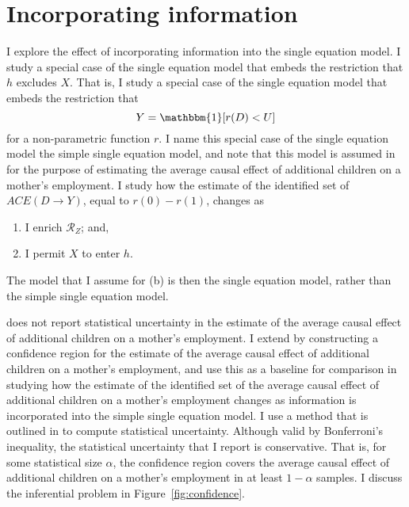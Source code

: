 \documentclass[12pt,a4paper,twoside]{article}
\numberwithin{equation}{section}
\begin{document}
\section{Incorporating information}
I explore the effect of incorporating information into the single equation model. I study a special case of the single equation model that embeds the restriction that $h$ excludes $X$. That is, I study a special case of the single equation model that embeds the restriction that 
\[Y=\mathbbm{1}[r(D)<U]\]
for a non-parametric function $r$. I name this special case of the single equation model the simple single equation model, and note that this model is assumed in \cite{cr13} for the purpose of estimating the average causal effect of additional children on a mother's employment. I study how the estimate of the identified set of $ACE(D\rightarrow Y)$, equal to $r(0)-r(1)$, changes as 
\begin{enumerate}[(a.)]
\item I enrich $\mathcal{R}_Z$; and,
\item I permit $X$ to enter $h$.
\end{enumerate}
The model that I assume for (b) is then the single equation model, rather than the simple single equation model. 

\cite{cr13} does not report statistical uncertainty in the estimate of the average causal effect of additional children on a mother's employment. I extend \cite{cr13} by constructing a confidence region for the estimate of the average causal effect of additional children on a mother's employment, and use this as a baseline for comparison in studying how the estimate of the identified set of the average causal effect of additional children on a mother's employment changes as information is incorporated into the simple single equation model. I use a method that is outlined in \cite{cHlr13} to compute statistical uncertainty. Although valid by Bonferroni's inequality, the statistical uncertainty that I report is conservative. That is, for some statistical size $\alpha$, the confidence region covers the average causal effect of additional children on a mother's employment in at least $1-\alpha$ samples. I discuss the inferential problem in Figure~\ref{fig:confidence}.
\end{document}
